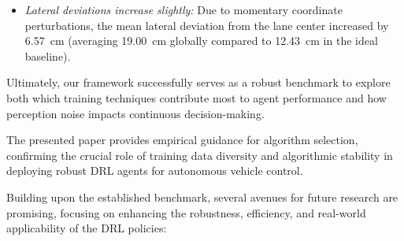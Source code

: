 \documentclass[sn-mathphys,Numbered]{sn-jnl}
\begin{document}
\begin{itemize}
\begin{itemize}
        \item \textit{Lateral deviations increase slightly:} Due to momentary coordinate perturbations, the mean lateral deviation from the lane center increased by 6.57~cm (averaging 19.00~cm globally compared to 12.43~cm in the ideal baseline).
    \end{itemize}
    Ultimately, our framework successfully serves as a robust benchmark to explore both which training techniques contribute most to agent performance and how perception noise impacts continuous decision-making.
\end{itemize}

The presented paper provides empirical guidance for algorithm selection, confirming the crucial role of training data diversity and algorithmic stability in deploying robust DRL agents for autonomous vehicle control.

Building upon the established benchmark, several avenues for future research are promising, focusing on enhancing the robustness, efficiency, and real-world applicability of the DRL policies:
\end{document}
